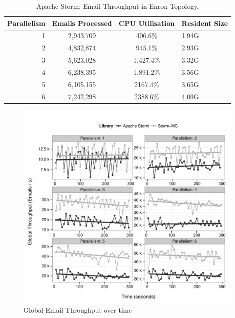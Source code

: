 \documentclass[bsc,logo,frontabs,twoside,singlespacing,normalheadings,parskip]{infthesis}\usepackage[]{graphicx}\usepackage[]{color}
\makeatletter
\def\maxwidth{ %
  \ifdim\Gin@nat@width>\linewidth
    \linewidth
  \else
    \Gin@nat@width
  \fi
}
\newenvironment{knitrout}{}{} %
\makeatother
\begin{document}
\begin{table}[!htb]
\begin{adjustwidth}{-0.5in}{-0.5in}
\centering
\small
\begin{tabular}{@{}rccl@{}}
    \textbf{Parallelism} & \textbf{Emails Processed} & \textbf{CPU Utilisation} & \textbf{Resident Size} \\ \toprule
    1 & {2,943,709} & {406.6\%} & {1.94G} \\
    2 & {4,832,874} & {945.1\%} & {2.93G} \\
    3 & {5,623,028} & {1,427.4\%} & {3.32G} \\
    4 & {6,238,395} & {1,891.2\%} & {3.56G} \\
    5 & {6,105,155} & {2167.4\%} & {3.65G} \\
    6 & {7,242,298} & {2388.6\%} & {4.09G} \\
\end{tabular}
\caption{Apache Storm: Email Throughput in Enron Topology.}
\label{table:storm_enron}
\end{adjustwidth}
\end{table}

\begin{knitrout}
\color{fgcolor}\begin{figure}[!htb]

{\centering \includegraphics[width=\maxwidth]{figure/enron-plot-1} 

}

\caption[Global Email Throughput over time]{Global Email Throughput over time}\label{fig:enron-plot}
\end{figure}


\end{knitrout}
\end{document}
